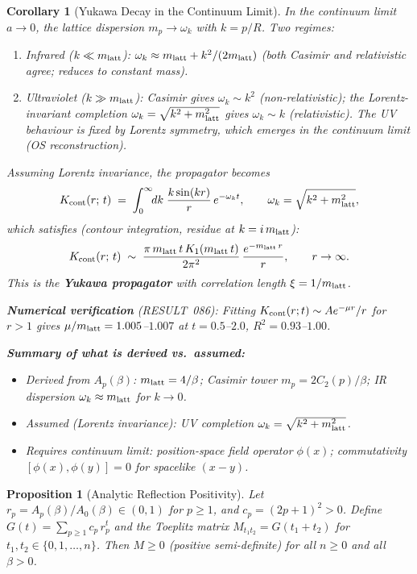 \documentclass[12pt]{article}
\newtheorem{proposition}[theorem]{Proposition}
\newtheorem{corollary}[theorem]{Corollary}
\theoremstyle{definition}
\theoremstyle{remark}
\begin{document}
\begin{corollary}[Yukawa Decay in the Continuum Limit]\label{cor:yukawa}
In the continuum limit $a\to 0$, the lattice dispersion $m_p \to \omega_k$ with
$k = p/R$.  Two regimes:
\begin{enumerate}
\item \emph{Infrared} ($k \ll m_{\rm latt}$):
      $\omega_k \approx m_{\rm latt} + k^2/(2m_{\rm latt})$ (both Casimir and
      relativistic agree; reduces to constant mass).
\item \emph{Ultraviolet} ($k \gg m_{\rm latt}$):
      Casimir gives $\omega_k \sim k^2$ (non-relativistic);
      the Lorentz-invariant completion $\omega_k = \sqrt{k^2 + m_{\rm latt}^2}$
      gives $\omega_k \sim k$ (relativistic).
      The UV behaviour is fixed by Lorentz symmetry, which emerges
      in the continuum limit (OS reconstruction).
\end{enumerate}
Assuming Lorentz invariance, the propagator becomes
\[
K_{\rm cont}(r;\,t)
\;=\;
\int_0^\infty \!\! dk\;\frac{k\sin(kr)}{r}\,e^{-\omega_k t},
\qquad
\omega_k = \sqrt{k^2 + m_{\rm latt}^2},
\]
which satisfies (contour integration, residue at $k = i\,m_{\rm latt}$):
\[
K_{\rm cont}(r;\,t)
\;\sim\;
\frac{\pi\,m_{\rm latt}\,t\,K_1(m_{\rm latt}\,t)}{2\pi^2}\,
\frac{e^{-m_{\rm latt}\,r}}{r}, \qquad r\to\infty.
\]
This is the \textbf{Yukawa propagator} with correlation length $\xi = 1/m_{\rm latt}$.

\textbf{Numerical verification} (RESULT~086): Fitting $K_{\rm cont}(r;t) \sim A e^{-\mu r}/r$
for $r > 1$ gives $\mu/m_{\rm latt} = 1.005$--$1.007$ at $t = 0.5$--$2.0$, $R^2 = 0.93$--$1.00$.

\textbf{Summary of what is derived vs.\ assumed:}
\begin{itemize}
\item Derived from $A_p(\beta)$: $m_{\rm latt} = 4/\beta$; Casimir tower $m_p = 2C_2(p)/\beta$;
      IR dispersion $\omega_k \approx m_{\rm latt}$ for $k\to 0$.
\item Assumed (Lorentz invariance): UV completion $\omega_k = \sqrt{k^2 + m_{\rm latt}^2}$.
\item Requires continuum limit: position-space field operator $\phi(x)$;
      commutativity $[\phi(x), \phi(y)] = 0$ for spacelike $(x-y)$.
\end{itemize}
\end{corollary}

\begin{proposition}[Analytic Reflection Positivity]\label{prop:rp_analytic}
Let $r_p = A_p(\beta)/A_0(\beta) \in (0,1)$ for $p \geq 1$, and
$c_p = (2p+1)^2 > 0$.
Define $G(t) = \sum_{p\geq 1} c_p\,r_p^t$ and the Toeplitz matrix
$M_{t_1 t_2} = G(t_1 + t_2)$ for $t_1, t_2 \in \{0,1,\ldots,n\}$.
Then $M \geq 0$ (positive semi-definite) for all $n \geq 0$ and all $\beta > 0$.
\end{proposition}
\end{document}
